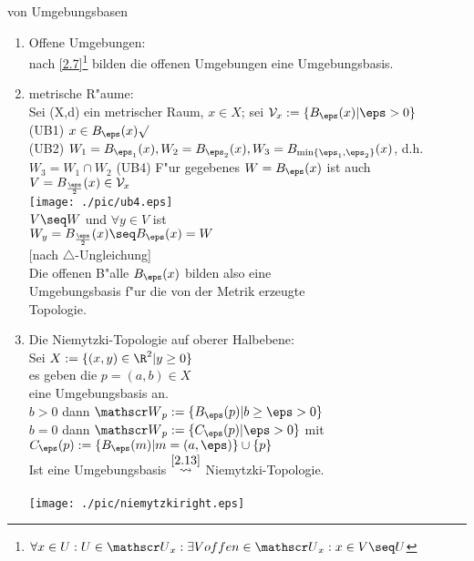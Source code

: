 \begin{beispiel}\label{2.14}{von Umgebungsbasen}
\begin{enumerate}
\item Offene Umgebungen:\\ nach \ref{2.7}\footnote{$\forall x\in U: U\in \umg{U}{x}:\exists V offen\in \umg{U}{x}:x\in V\seq U$} bilden die offenen Umgebungen eine Umgebungsbasis.
\item metrische R"aume:\\
Sei (X,d) ein metrischer Raum, $x\in X$; sei $\umgbas{V}{x}:=\{ B_\eps (x)|\eps >0\}$\\
(UB1) $x\in B_\eps (x) \surd $\\
(UB2) $W_1=B_{\eps_1} (x),W_2 = B_{\eps_2} (x), W_3=B_{\min\{\eps_1,\eps_2\}} (x)$, d.h. $W_3 = W_1\cap W_2$
(UB4) F"ur gegebenes $W=B_{\eps} (x)$ ist auch $V=B_{\frac{\eps}{2}} (x)\in\umgbas{V}{x}$\\
\texttt{[image: ./pic/ub4.eps]}\vspace*{-4.1cm}\\
\hspace*{6.5cm}\vspace*{0.1cm}$V\seq W$ und $\forall y\in V$ ist\\
\hspace*{6.5cm}\vspace*{0.1cm}$W_y = B_\frac{\eps}{2} (x)\seq B_{\eps} (x)=W$\\
\hspace*{6.5cm}\vspace*{0.1cm}[nach $\triangle$-Ungleichung]\\
\hspace*{4.5cm}\vspace*{0.1cm}Die offenen B"alle $B_{\eps} (x)$ bilden also eine\\
\hspace*{4.5cm}\vspace*{0.1cm}Umgebungsbasis f"ur die von der Metrik erzeugte\\
\hspace*{4.5cm} Topologie.\\
\item Die {\sc Niemytzki}-Topologie auf oberer Halbebene:\\
Sei $X:=\{ (x,y)\in\R^2|y\geq 0\}$\\
es geben die $p=(a,b)\in X$\\ eine Umgebungsbasis an.\\
$b>0$ dann $\umg{W}{p}:=\{B_{\eps} (p)|b\geq\eps>0 \}$\\
$b=0$ dann $\umg{W}{p}:=\{C_\eps(p)|\eps >0\}$ mit\\ $C_\eps (p):=\{B_\eps (m)|m=(a,\eps)\}\cup\{ p\}$\\
Ist eine Umgebungsbasis $\stackrel{\ref{2.13}}{\leadsto}$ Niemytzki-Topologie.\\
\vspace*{-5.5cm}\\ \hspace*{9cm}\texttt{[image: ./pic/niemytzkiright.eps]}\\


\end{enumerate}
\end{beispiel}
